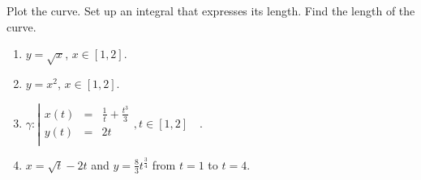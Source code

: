 Plot the curve. Set up an integral that expresses its length. Find the length of the curve. 
\begin{enumerate}[ref={\fcProblemRef}]
\item $y=\sqrt{x}$, $x\in [1, 2]$.
\item $y=x^2$, $x\in [1, 2]$.
\item 
$\gamma:\left| 
\begin{array}{rcl}
x(t)&=&\frac{1}{t}+\frac{t^3}{3}\\
y(t)&=&2t\\
\end{array}\right., t\in [1,2]\quad . $
\item \label{problemlengthx=sqrt(t)-2t,y=8/3t^(3/4)} $\displaystyle x = \sqrt{t} - 2t$ and $\displaystyle y = \frac{8}{3}t^{\frac{3}{4}}$ from $t = 1$ to $t = 4$.
\end{enumerate}

